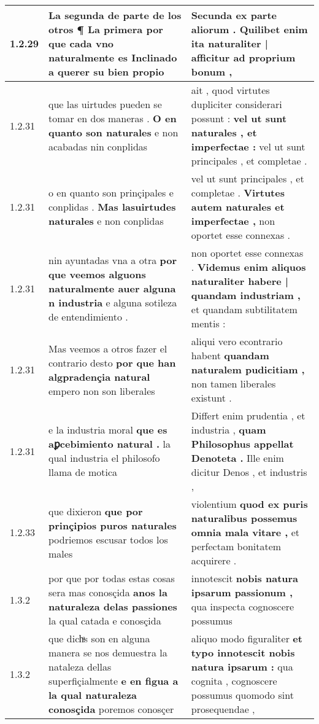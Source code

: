 \begin{tabular}{|p{1cm}|p{6.5cm}|p{6.5cm}|}
1.2.29 & La segunda de parte de los otros ¶ \textbf{ La primera por que cada vno naturalmente es Inclinado } a querer su bien propio & Secunda ex parte aliorum . \textbf{ Quilibet enim ita naturaliter | afficitur } ad proprium bonum , \\\hline
1.2.31 & que las uirtudes pueden se tomar en dos maneras . \textbf{ O en quanto son naturales } e non acabadas nin conplidas & ait , quod virtutes dupliciter considerari possunt : \textbf{ vel ut sunt naturales , et imperfectae : } vel ut sunt principales , et completae . \\\hline
1.2.31 & o en quanto son prinçipales e conplidas . \textbf{ Mas lasuirtudes naturales } e non conplidas & vel ut sunt principales , et completae . \textbf{ Virtutes autem naturales et imperfectae , } non oportet esse connexas . \\\hline
1.2.31 & nin ayuntadas vna a otra \textbf{ por que veemos alguons naturalmente auer alguna n industria } e alguna sotileza de entendimiento . & non oportet esse connexas . \textbf{ Videmus enim aliquos naturaliter habere | quandam industriam , } et quandam subtilitatem mentis : \\\hline
1.2.31 & Mas veemos a otros fazer el contrario desto \textbf{ por que han algpradençia natural } empero non son liberales & aliqui vero econtrario habent \textbf{ quandam naturalem pudicitiam , } non tamen liberales existunt . \\\hline
1.2.31 & e la industria moral \textbf{ que es aꝑcebimiento natural . } la qual industria el philosofo llama de motica & Differt enim prudentia , et industria , \textbf{ quam Philosophus appellat Denoteta . } Ille enim dicitur Denos , et industris , \\\hline
1.2.33 & que dixieron \textbf{ que por prinçipios puros naturales } podriemos escusar todos los males & violentium \textbf{ quod ex puris naturalibus possemus omnia mala vitare , } et perfectam bonitatem acquirere . \\\hline
1.3.2 & por que por todas estas cosas sera mas conosçida \textbf{ anos la naturaleza delas passiones } la qual catada e conosçida & innotescit \textbf{ nobis natura ipsarum passionum , } qua inspecta cognoscere possumus \\\hline
1.3.2 & que dichͣs son en alguna manera se nos demuestra la nataleza dellas superfiçialmente \textbf{ e en figua a la qual naturaleza conosçida } poremos conosçer & aliquo modo figuraliter \textbf{ et typo innotescit nobis natura ipsarum : } qua cognita , cognoscere possumus quomodo sint prosequendae , \\\hline

\end{tabular}
